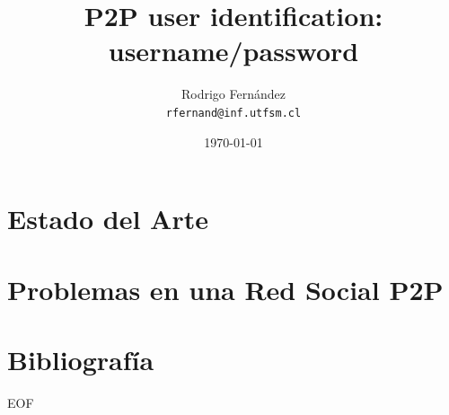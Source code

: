 \documentclass[12pt]{beamer}
\title{P2P user identification: username/password}
\subtitle{}
\author[R. Fernández]{Rodrigo Fernández \\ \small{\texttt{rfernand@inf.utfsm.cl}}}
\institute[]{Universidad Técnica Federico Santa María}
\date{\today}
\begin{document}

  \frame{\titlepage}
  \frame{\tableofcontents}
	\section{}
  
  \section{Estado del Arte}
  \label{sec:soa}
  
  \section{Problemas en una Red Social P2P}
  \label{sec:problemas_p2pson}
  
  \section{Bibliografía}
  
\frame
{
	\vspace{2cm}
	\begin{center}
		\Large{EOF}
	\end{center}
}
\end{document}
